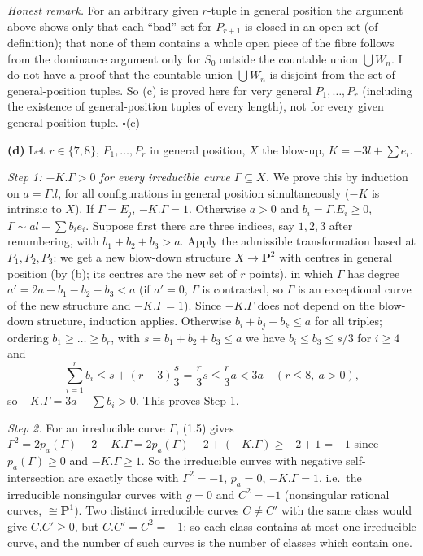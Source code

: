 \documentclass[11pt]{article}
\begin{document}
\emph{Honest remark.} For an arbitrary given $r$-tuple in general position the argument above shows only that each ``bad'' set for $P_{r+1}$ is closed in an open set (of definition); that none of them contains a whole open piece of the fibre follows from the dominance argument only for $S_0$ outside the countable union $\bigcup W_n$. I do not have a proof that the countable union $\bigcup W_n$ is disjoint from the set of general-position tuples. So (c) is proved here for very general $P_1,\dots,P_r$ (including the existence of general-position tuples of every length), not for every given general-position tuple. \hfill$\square$(c)

\textbf{(d)} Let $r\in\{7,8\}$, $P_1,\dots,P_r$ in general position, $X$ the blow-up, $K=-3l+\sum e_i$.

\emph{Step 1: $-K.\Gamma>0$ for every irreducible curve $\Gamma\subseteq X$.} We prove this by induction on $a=\Gamma.l$, for all configurations in general position simultaneously ($-K$ is intrinsic to $X$). If $\Gamma=E_j$, $-K.\Gamma=1$. Otherwise $a>0$ and $b_i=\Gamma.E_i\ge0$, $\Gamma\sim al-\sum b_ie_i$. Suppose first there are three indices, say $1,2,3$ after renumbering, with $b_1+b_2+b_3>a$. Apply the admissible transformation based at $P_1,P_2,P_3$: we get a new blow-down structure $X\to\mathbf P^2$ with centres in general position (by (b); its centres are the new set of $r$ points), in which $\Gamma$ has degree $a'=2a-b_1-b_2-b_3<a$ (if $a'=0$, $\Gamma$ is contracted, so $\Gamma$ is an exceptional curve of the new structure and $-K.\Gamma=1$). Since $-K.\Gamma$ does not depend on the blow-down structure, induction applies. Otherwise $b_i+b_j+b_k\le a$ for all triples; ordering $b_1\ge\dots\ge b_r$, with $s=b_1+b_2+b_3\le a$ we have $b_i\le b_3\le s/3$ for $i\ge4$ and
\[
\sum_{i=1}^rb_i\le s+(r-3)\frac s3=\frac r3s\le\frac r3a<3a\quad(r\le8,\ a>0),
\]
so $-K.\Gamma=3a-\sum b_i>0$. This proves Step 1.

\emph{Step 2.} For an irreducible curve $\Gamma$, (1.5) gives $\Gamma^2=2p_a(\Gamma)-2-K.\Gamma=2p_a(\Gamma)-2+(-K.\Gamma)\ge-2+1=-1$ since $p_a(\Gamma)\ge0$ and $-K.\Gamma\ge1$. So the irreducible curves with negative self-intersection are exactly those with $\Gamma^2=-1$, $p_a=0$, $-K.\Gamma=1$, i.e.\ the irreducible nonsingular curves with $g=0$ and $C^2=-1$ (nonsingular rational curves, $\cong\mathbf P^1$). Two distinct irreducible curves $C\ne C'$ with the same class would give $C.C'\ge0$, but $C.C'=C^2=-1$: so each class contains at most one irreducible curve, and the number of such curves is the number of classes which contain one.
\end{document}
